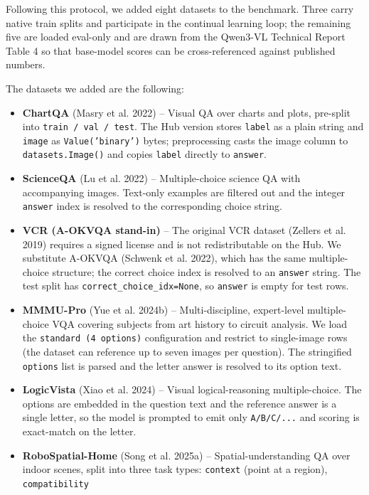 \documentclass{article}
\begin{document}
Following this protocol, we added eight datasets to the benchmark. Three carry native train splits and
participate in the continual learning loop; the remaining five are loaded eval-only and are drawn from
the Qwen3-VL Technical Report Table 4 \cite{qwen3vl} so that base-model scores can be cross-referenced
against published numbers.

The datasets we added are the following:

\begin{itemize}
		\item \textbf{ChartQA} (Masry et al. 2022) -- Visual QA over charts and plots, pre-split into
				\texttt{train / val / test}. The Hub version stores \texttt{label} as a plain string and
				\texttt{image} as \texttt{Value('binary')} bytes; preprocessing casts the image column to
				\texttt{datasets.Image()} and copies \texttt{label} directly to \texttt{answer}.
		\item \textbf{ScienceQA} (Lu et al. 2022) -- Multiple-choice science QA with accompanying images.
				Text-only examples are filtered out and the integer \texttt{answer} index is resolved to the
				corresponding choice string.
		\item \textbf{VCR (A-OKVQA stand-in)} -- The original VCR dataset (Zellers et al. 2019) requires
				a signed license and is not redistributable on the Hub. We substitute A-OKVQA (Schwenk et al.
				2022), which has the same multiple-choice structure; the correct choice index is resolved to
				an \texttt{answer} string. The test split has \texttt{correct\_choice\_idx=None}, so
				\texttt{answer} is empty for test rows.
		\item \textbf{MMMU-Pro} (Yue et al. 2024b) -- Multi-discipline, expert-level multiple-choice VQA
				covering subjects from art history to circuit analysis. We load the \texttt{standard
				(4 options)} configuration and restrict to single-image rows (the dataset can reference up
				to seven images per question). The stringified \texttt{options} list is parsed and the
				letter answer is resolved to its option text.
		\item \textbf{LogicVista} (Xiao et al. 2024) -- Visual logical-reasoning multiple-choice. The
				options are embedded in the question text and the reference answer is a single letter, so
				the model is prompted to emit only \texttt{A/B/C/...} and scoring is exact-match on the
				letter.
		\item \textbf{RoboSpatial-Home} (Song et al. 2025a) -- Spatial-understanding QA over indoor
				scenes, split into three task types: \texttt{context} (point at a region), \texttt{compatibility}

\end{itemize}
\end{document}
